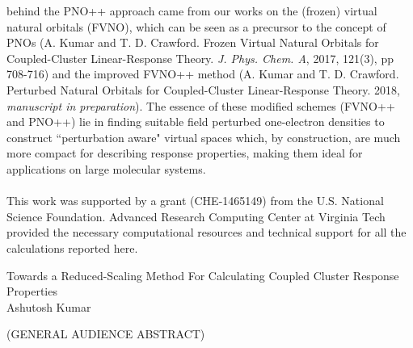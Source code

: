 \documentclass[12pt]{report}
\begin{document}
behind the PNO++ approach came from our works on the (frozen) virtual natural orbitals (FVNO), which can 
be seen as a precursor to the concept of PNOs (A. Kumar and T. D. Crawford. Frozen Virtual Natural Orbitals for 
Coupled-Cluster Linear-Response Theory. {\em J. Phys. Chem. A}, 2017, 121(3), pp 708-716) and the improved 
FVNO++ method (A. Kumar and T. D. Crawford. Perturbed Natural Orbitals for Coupled-Cluster Linear-Response 
Theory. 2018, {\em manuscript in preparation}). The essence of these modified schemes (FVNO++ and PNO++) lie in finding suitable 
field perturbed one-electron densities to construct ``perturbation aware" virtual spaces which,
by construction, are much more compact for describing response properties, making them ideal
for applications on large molecular systems.\\\\
\thispagestyle{empty}
\vfill
This work was supported by a grant (CHE-1465149) from
the U.S. National Science Foundation. Advanced Research Computing 
Center at Virginia Tech provided the necessary computational resources and technical 
support for all the calculations reported here.

\pagebreak
\thispagestyle{empty}
\begin{center}

{\Large 
Towards a Reduced-Scaling Method For Calculating Coupled Cluster Response Properties
}\\

\vspace{8em}
Ashutosh Kumar
\vspace{8em}

(GENERAL AUDIENCE ABSTRACT)

\end{center}
\end{document}
